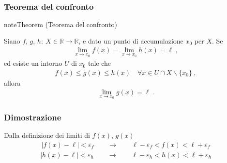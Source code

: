 \documentclass[letterpaper,10pt,italian]{jupyterBook}
\begin{document}
\subsubsection{Teorema del confronto}
\label{\detokenize{ch/infinitesimal_calculus/analysis:teorema-del-confronto}}\label{\detokenize{ch/infinitesimal_calculus/analysis:infinitesimal-calculus-limits-thms-comparison}}\label{None:thm:infinitesimal-calculus:continuous-fun:thms:comparison}
\begin{sphinxadmonition}{note}{Theorem  (Teorema del confronto)}



\sphinxAtStartPar
Siano \(f\), \(g\), \(h: \ X \in \mathbb{R} \rightarrow \mathbb{R}\), e dato un punto di accumulazione \(x_0\) per \(X\). Se
\begin{equation*}
\begin{split}\lim_{x \rightarrow x_0} f(x) = \lim_{x \rightarrow x_0} h(x) = \ell \ ,\end{split}
\end{equation*}
\sphinxAtStartPar
ed esiste un intorno \(U\) di \(x_0\) tale che
\begin{equation*}
\begin{split}f(x) \le g(x) \le h(x) \quad \forall x \in U \cap X \backslash \{ x_0 \} \ ,\end{split}
\end{equation*}
\sphinxAtStartPar
allora
\begin{equation*}
\begin{split}\lim_{x \rightarrow x_0} g(x) = \ell \ .\end{split}
\end{equation*}\end{sphinxadmonition}
\subsubsection*{Dimostrazione}

\sphinxAtStartPar
Dalla definizione dei limiti di \(f(x)\), \(g(x)\)
\begin{equation*}
\begin{split}|f(x) - \ell| < \varepsilon_f \qquad \rightarrow \qquad \ell - \varepsilon_f < f(x) < \ell + \varepsilon_f\end{split}
\end{equation*}\begin{equation*}
\begin{split}|h(x) - \ell| < \varepsilon_h \qquad \rightarrow \qquad \ell - \varepsilon_h < h(x) < \ell + \varepsilon_h\end{split}
\end{equation*}
\sphinxAtStartPar
{} 
\end{document}
